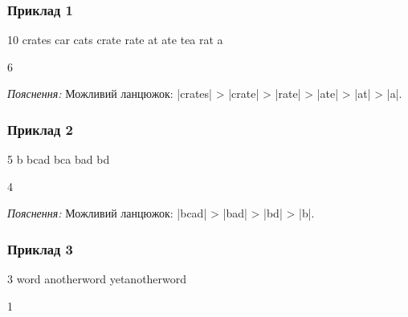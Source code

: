 \documentclass[12pt,a4paper]{article}
\begin{document}
\pagebreak


\subsubsection*{Приклад 1}

\textbf{}

\begin{codeblock}
10
crates
car
cats
crate
rate
at
ate
tea
rat
a
\end{codeblock}

\textbf{}

\begin{codeblock}
6
\end{codeblock}

\emph{Пояснення:} Можливий ланцюжок: |crates| > |crate| > |rate| > |ate| > |at| > |a|.


\subsubsection*{Приклад 2}

\textbf{}

\begin{codeblock}
5
b
bcad
bca
bad
bd
\end{codeblock}

\textbf{}

\begin{codeblock}
4
\end{codeblock}

\emph{Пояснення:} Можливий ланцюжок: |bcad| > |bad| > |bd| > |b|.


\subsubsection*{Приклад 3}

\textbf{}

\begin{codeblock}
3
word
anotherword
yetanotherword
\end{codeblock}

\textbf{}

\begin{codeblock}
1
\end{codeblock}
\end{document}
